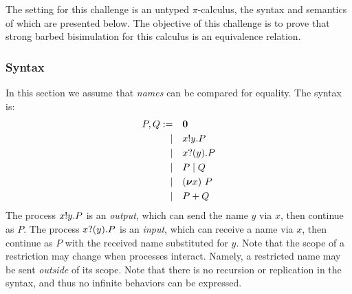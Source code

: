 The setting for this challenge is an untyped \( \pi \)-calculus, the syntax and semantics of which are presented below.
The objective of this challenge is to prove that strong barbed bisimulation for this calculus is an equivalence relation.

\subsubsection{Syntax}
In this section 
 we assume that \emph{names}  can be compared for equality. 
The syntax is:
\begin{align*}
  P,Q :=&&& \bm{0} \\
  |&&& x ! y . P \\
  |&&& x ? (y) . P \\
  |&&& P \mid Q \\
  |&&& (\bm{\nu} x)~P \\
  |&&& P + Q
\end{align*}
The process \( x ! y . P \) is an \emph{output}, which can send the name \( y \) via \( x \), then continue as \( P \).
The process \( x ? (y) . P \) is an \emph{input}, which can receive a name via \( x \), then continue as \( P \) with the received name substituted for \( y \).
Note that the scope of a restriction may change when processes interact. Namely, a restricted name may be sent \emph{outside} of its scope.
Note that there is no recursion or replication in the syntax, and thus no infinite behaviors can be expressed.


